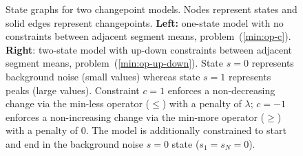 \documentclass[article]{jss}
\begin{document}
\begin{figure}
  \centering
  \begin{minipage}{3in}
    \centering
  \end{minipage}
  \begin{minipage}{3in}
    \centering
  \end{minipage}
  \caption{State graphs for two changepoint models. Nodes represent
    states and solid edges represent changepoints. \textbf{Left:}
    one-state model with no constraints between adjacent segment
    means, problem~(\ref{min:op-c}). \textbf{Right}: two-state model with
    up-down constraints between adjacent segment means,
    problem~(\ref{min:op-up-down}). State $s=0$ represents background
    noise (small values) whereas state $s=1$ represents peaks (large
    values). Constraint $c=1$ enforces a non-decreasing change via the
    min-less operator ($\leq$) with a penalty of $\lambda$; $c=-1$
    enforces a non-increasing change via the min-more operator
    ($\geq$) with a penalty of $0$. The model is additionally
    constrained to start and end in the background noise $s=0$ state
    ($s_1=s_N=0$).}
  \label{fig:state-graph}
\end{figure}
\end{document}
